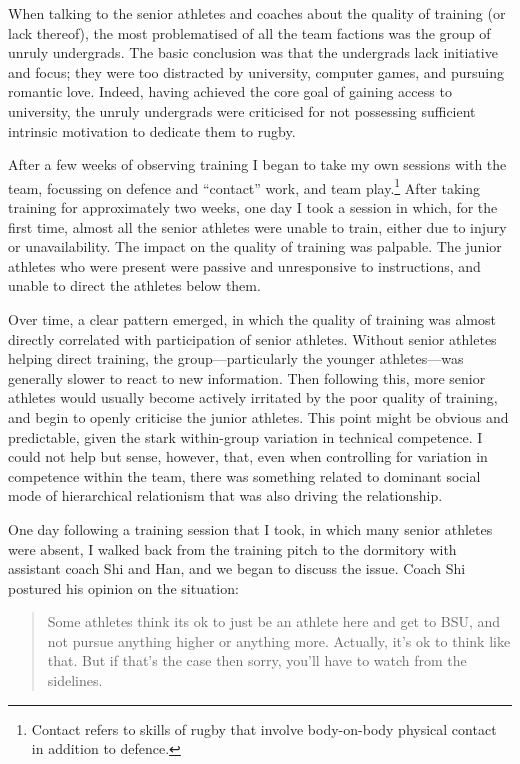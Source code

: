 \begin{CJK}{UTF8}{gbsn}
When talking to the senior athletes and coaches about the quality of training (or lack thereof), the most problematised of all the team factions was the group of unruly undergrads.  The basic conclusion was that the undergrads lack initiative and focus; they were too distracted by university, computer games, and pursuing romantic love. Indeed, having achieved the core goal of gaining access to university, the unruly undergrads were criticised for not possessing sufficient intrinsic motivation to dedicate them to rugby.

After a few weeks of observing training I began to take my own sessions with the team, focussing on defence and ``contact'' work, and team play.\footnote{Contact refers to skills of rugby that involve body-on-body physical contact in addition to defence.}  After taking training for approximately two weeks, one day I took a session in which, for the first time, almost all the senior athletes were unable to train, either due to injury or unavailability.  The impact on the quality of training was palpable.  The junior athletes who were present were passive and unresponsive to instructions, and unable to direct the athletes below them.

Over time, a clear pattern emerged, in which the quality of training was almost directly correlated with participation of senior athletes. Without senior athletes helping direct training, the group---particularly the younger athletes---was generally slower to react to new information.  Then following this, more senior athletes would usually become actively irritated by the poor quality of training, and begin to openly criticise the junior athletes.  This point might be obvious and predictable, given the stark within-group variation in technical competence.  I could not help but sense, however, that, even when controlling for variation in competence within the team, there was something related to dominant social mode of hierarchical relationism that was also driving the relationship.

One day following a training session that I took, in which many senior athletes were absent,  I walked back from the training pitch to the dormitory with assistant coach Shi and Han, and we began to discuss the issue. Coach Shi postured his opinion on the situation:

\begin{quotation}
  Some athletes think its ok to just be an athlete here and get to BSU, and not pursue anything higher or anything more.  Actually, it's ok to think like that. But if that's the case then sorry, you'll have to watch from the sidelines.
\end{quotation}



\end{CJK}
